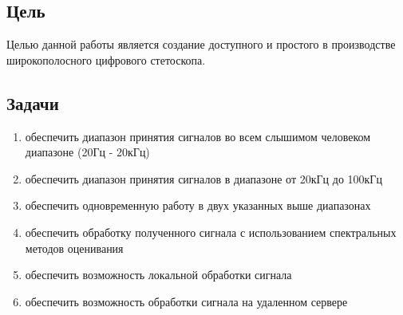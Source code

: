 \documentclass[../paper.tex]{subfiles}
\begin{document}
\subsection{Цель}
Целью данной работы является создание доступного и простого в производстве широкополосного цифрового стетоскопа.

\subsection{Задачи}
\begin{enumerate}
  \item обеспечить диапазон принятия сигналов во всем слышимом человеком диапазоне (20Гц - 20кГц)
  \item обеспечить диапазон принятия сигналов в диапазоне от 20кГц до 100кГц
  \item обеспечить одновременную работу в двух указанных выше диапазонах
  \item обеспечить обработку полученного сигнала с использованием спектральных методов оценивания
  \item обеспечить возможность локальной обработки сигнала
  \item обеспечить возможность обработки сигнала на удаленном сервере
\end{enumerate}
\end{document}
